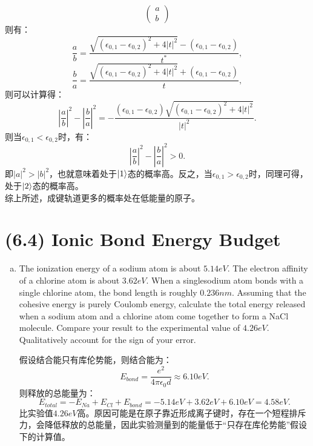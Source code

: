 \documentclass[reqno,a4paper,12pt]{amsart}
\begin{document}
\begin{enumerate}[(a)]
\begin{tcolorbox}[breakable, colback = black!5!white, colframe = black]
\[\begin{pmatrix}
			a \\
			b
		\end{pmatrix}
	\]
	则有：
	\[
		\frac{a}{b} = \frac{\sqrt{(\epsilon_{0,1} - \epsilon_{0,2})^2+4\vert t \vert^2} - (\epsilon_{0,1} - \epsilon_{0,2})}{t^*}, 
	\]
	\[
		\frac{b}{a} = \frac{\sqrt{(\epsilon_{0,1} - \epsilon_{0,2})^2+4\vert t \vert^2} + (\epsilon_{0,1} - \epsilon_{0,2})}{t}, 
	\]
	则可以计算得：
	\[
		\left\vert \frac{a}{b} \right\vert^2 - \left\vert \frac{b}{a} \right\vert^2 = -\frac{(\epsilon_{0,1} - \epsilon_{0,2})\sqrt{(\epsilon_{0,1} - \epsilon_{0,2})^2 + 4\vert t \vert^2}}{\vert t \vert^2}.
	\]
	则当$\epsilon_{0,1}<\epsilon_{0,2}$时，有：
	\[
		\left\vert \frac{a}{b} \right\vert^2 - \left\vert \frac{b}{a} \right\vert^2 > 0.
	\]
	即$\vert a \vert^2 > \vert b \vert^2$，也就意味着处于$\ket{1}$态的概率高。反之，当$\epsilon_{0,1}>\epsilon_{0,2}$时，同理可得，处于$\ket{2}$态的概率高。\\
	综上所述，成键轨道更多的概率处在低能量的原子。
	\end{tcolorbox}
\end{enumerate}

\section{\textbf{(6.4) Ionic Bond Energy Budget}}
\begin{enumerate}[(a)]
	\item The ionization energy of a sodium atom is about $5.14eV$. The electron affinity of a chlorine atom is about $3.62 eV$. When a singlesodium atom bonds with a single chlorine atom, the bond length is roughly $0.236nm$. Assuming that the cohesive energy is purely Coulomb energy, calculate the total energy released when a sodium atom and a chlorine atom come together to form a NaCl molecule. Compare your result to the experimental value of $4.26eV$. Qualitatively account for the sign of your error.
	\begin{tcolorbox}[breakable, colback = black!5!white, colframe = black]
	假设结合能只有库伦势能，则结合能为：
	\[
		E_{bond} = \frac{e^2}{4\pi\epsilon_0d} \approx 6.10 eV.
	\]
	则释放的总能量为：
	\[
		E_{total} = -E_{Na} + E_{Cl} + E_{bond} = -5.14eV + 3.62eV + 6.10eV = 4.58eV.
	\]
	比实验值$4.26eV$高。原因可能是在原子靠近形成离子键时，存在一个短程排斥力，会降低释放的总能量，因此实验测量到的能量低于“只存在库伦势能”假设下的计算值。
	\end{tcolorbox}
\end{enumerate}
\end{document}
